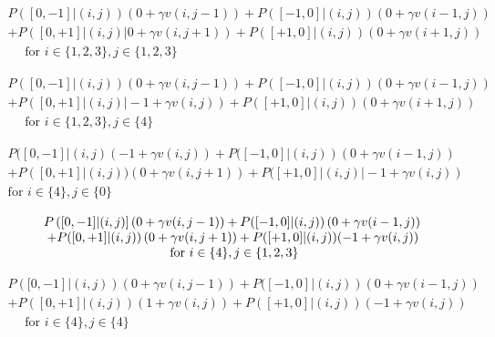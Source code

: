 \documentclass[11pt]{article}
\begin{document}
\begin{equation}
\begin{array}{c}
{P([0,-1] |(i,j))(0+\gamma v(i, j-1))+P([-1,0] |(i, j))(0+\gamma v(i-1, j))} \\
{+P([0,+1]|(i, j)| 0+\gamma v(i, j+1))+P([+1,0] |(i, j))(0+\gamma v(i+1, j))} \\
{\quad \text { for } i \in\{1,2,3\}, j \in\{1,2,3\}}
\end{array}
\end{equation}

\begin{equation}
\begin{array}{c}
{P([0,-1]|(i, j))(0+\gamma v(i, j-1))+P([-1,0] |(i, j))(0+\gamma v(i-1, j))} \\
{+P([0,+1]|(i, j)|-1+\gamma v(i, j))+P([+1,0] |(i, j))(0+\gamma v(i+1, j))} \\
{\quad \text { for } i \in\{1,2,3\}, j \in\{4\}}
\end{array}
\end{equation}

\begin{equation}
\begin{array}{c}
{\left.P(\left[0,-1\right]|(i, j)(-1+\gamma v(i, j))+P([-1,0]|(i, j)\right)\left(0+\gamma v \left(i-1, j\right)\right)} \\
{\left.+P\left([0,+1]\right|(i, j))(0+\gamma v(i, j+1))+P([+1,0]|(i, j)|-1+\gamma v(i, j)\right)} \\
{\text{for } i \in\{4\}, j \in\{0\}}
\end{array}
\end{equation}

\begin{equation}
\begin{array}{c}
{{P\left([0,-1] |(i,j)\right](0+\gamma v(i, j-1))+P([-1,0] |(i, j))\left(0+\gamma v(i-1, j)\right)}} \\
{{\left.+P([0,+1] |(i, j)\right)(0+\gamma v(i, j+1))+P([+1,0] |(i, j))(-1+\gamma v(i, j))}}\\
{\text { for } i \in\{4\}, j \in\{1,2,3\}}
\end{array}\\
\end{equation}


\begin{equation}
\begin{array}{c}
{\left.\left.P\left([0,-1\right] |(i, j)\right)(0+\gamma v(i, j-1))+P([-1,0]|(i, j)\right)(0+\gamma v(i-1, j))} \\
{+P([0,+1]|(i, j))(1+\gamma v(i, j))+P([+1,0]|(i,j))(-1+\gamma v(i, j))} \\
{\quad \text { for } i \in\{4\}, j \in\{4\}}
\end{array}
\end{equation}
\end{document}
